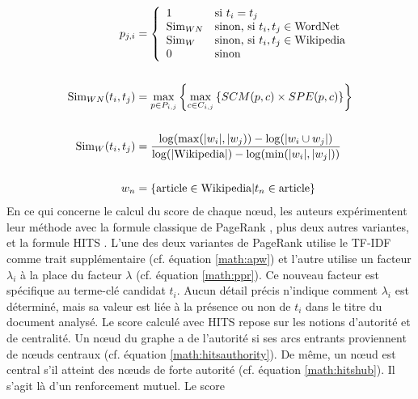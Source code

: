           \begin{align}
            p_{j, i} &= \left\{\begin{array}{ll}
              1 & \text{si $t_i = t_j$}\\
              \text{Sim}_{WN} & \text{sinon, si $t_i, t_j \in \text{WordNet}$}\\
               \text{Sim}_{W} &  \text{sinon, si $t_i, t_j \in \text{Wikipedia}$}\\
              0 & \text{sinon}
            \end{array}\right. \label{math:semanticrank}\\
            \notag\\
            \text{Sim}_{WN}(t_i, t_j) &= \max_{p \in P_{i, j}}\left\{\max_{c \in C_{i, j}}\left\{SCM(p, c) \times SPE(p, c)\right\}\right\} \label{math:wordnetsemanticrelatedness}\\
            \notag\\
            \text{Sim}_{W}(t_i, t_j) &= \frac{\log(\max(|w_i|, |w_j)) - \log(|w_i \cup w_j|)}{\log(|\text{Wikipedia}|) - \log(\min(|w_i|, |w_j|))} \label{math:wikipediasemanticrelatedness}\\
            \notag\\
            w_n &= \left\{\text{article} \in \text{Wikipedia} | t_n \in \text{article}\right\} \notag
          \end{align}
          En ce qui concerne le calcul du score de chaque n\oe{}ud, les auteurs
          expérimentent leur méthode avec la formule classique de PageRank
          \citep{brin1998pagerank}, plus deux autres variantes, et la formule
          HITS \citep{kleinberg1999hits}. L'une des deux variantes de PageRank
          utilise le TF-IDF comme trait supplémentaire (cf. équation
          \ref{math:apw}) et l'autre utilise un facteur $\lambda_i$ à la place
          du facteur $\lambda$ (cf. équation \ref{math:ppr}). Ce nouveau facteur
          est spécifique au terme-clé candidat $t_i$. Aucun détail précis
          n'indique comment $\lambda_i$ est déterminé, mais sa valeur est liée à
          la présence ou non de $t_i$ dans le titre du document analysé. Le
          score calculé avec HITS repose sur les notions d'autorité et de
          centralité. Un n\oe{}ud du graphe a de l'autorité si ses arcs entrants
          proviennent de n\oe{}uds centraux (cf. équation
          \ref{math:hitsauthority}). De même, un n\oe{}ud est central s'il
          atteint des n\oe{}uds de forte autorité (cf. équation
          \ref{math:hitshub}). Il s'agit là d'un renforcement mutuel. Le score
